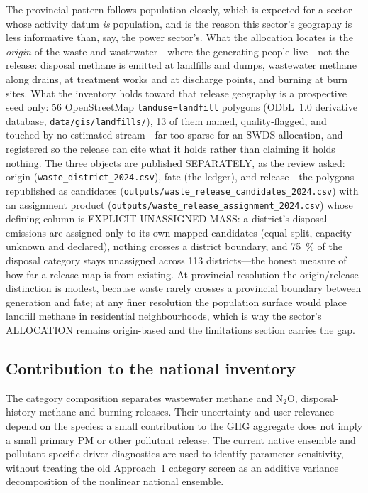 The provincial pattern follows population closely, which is expected for a sector whose
activity datum \emph{is} population, and is the reason this sector's geography is less
informative than, say, the power sector's. What the allocation locates is the \emph{origin}
of the waste and wastewater---where the generating people live---not the release: disposal
methane is emitted at landfills and dumps, wastewater methane along drains, at treatment
works and at discharge points, and burning at burn sites. What the inventory holds toward
that release geography is a prospective seed only: \num{56} OpenStreetMap
\texttt{landuse=landfill} polygons \citep{osm2026} (ODbL~1.0 derivative database,
\texttt{data/gis/landfills/}), \num{13} of them named, quality-flagged, and touched by no
estimated stream---far too sparse for an SWDS allocation, and registered so the release
can cite what it holds rather than claiming it holds nothing. The three
objects are published SEPARATELY, as the review asked: origin
(\texttt{waste\_district\_2024.csv}), fate (the ledger), and release---the polygons
republished as candidates
(\texttt{outputs/waste\_release\_candidates\_2024.csv}) with an assignment product
(\texttt{outputs/waste\_\allowbreak release\_\allowbreak assignment\_\allowbreak 2024.csv})
whose defining column is EXPLICIT UNASSIGNED MASS: a district's disposal emissions
are assigned only to its own mapped candidates (equal split, capacity unknown and
declared), nothing crosses a district boundary, and \SI{75}{\percent} of the
disposal category stays unassigned across \num{113} districts---the honest measure
of how far a release map is from existing. At provincial resolution
the origin/release distinction is modest, because waste
rarely crosses a provincial boundary between generation and fate; at any finer resolution
the population surface would place landfill methane in residential neighbourhoods, which
is why the sector's ALLOCATION remains origin-based and the limitations
section carries the gap.

\subsection{Contribution to the national inventory}

The category composition separates wastewater methane and N$_2$O, disposal-history methane and burning releases. Their uncertainty and user relevance depend on the species: a small contribution to the GHG aggregate does not imply a small primary PM or other pollutant release. The current native ensemble and pollutant-specific driver diagnostics are used to identify parameter sensitivity, without treating the old Approach~1 category screen as an additive variance decomposition of the nonlinear national ensemble.
